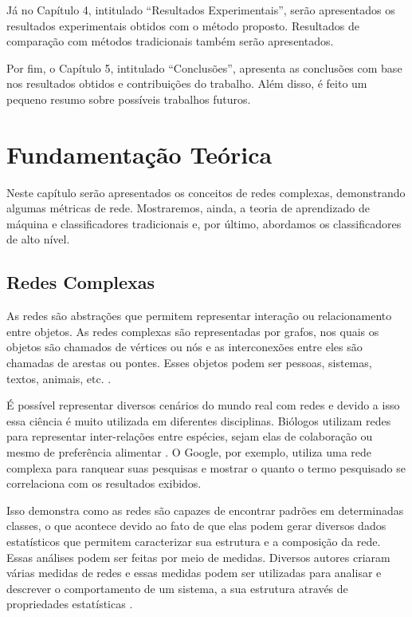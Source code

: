 \documentclass[
12pt,        %
oneside,     %
a4paper,     %
english,       %
brazil        %
%
%
]{ppgca}
\begin{document}
Já no Capítulo 4, intitulado “Resultados Experimentais”, serão apresentados os resultados experimentais obtidos com o método proposto. Resultados de comparação com métodos tradicionais também serão apresentados. 

Por fim, o Capítulo 5, intitulado “Conclusões”, apresenta as conclusões com base nos resultados obtidos e contribuições do trabalho. Além disso, é feito um pequeno resumo sobre possíveis trabalhos futuros.

\chapter{Fundamentação Teórica}
Neste capítulo serão apresentados os conceitos de redes complexas, demonstrando algumas métricas de rede. Mostraremos, ainda, a teoria de aprendizado de máquina e classificadores tradicionais e, por último, abordamos os classificadores de alto nível.



\section{Redes Complexas}

As redes são abstrações que permitem representar interação ou relacionamento entre objetos. As redes complexas são representadas por grafos, nos quais os objetos são chamados de vértices ou nós e as interconexões entre eles são chamadas de arestas ou pontes. Esses objetos podem ser pessoas, sistemas, textos, animais, etc. \cite{AlbertBarabasi1999, AlbertBarabasi2002, Newman_2003, Silva2016, ThompsonEtAl, WattsStrogatz1998}.

É possível representar diversos cenários do mundo real com redes e devido a isso essa ciência é muito utilizada em diferentes disciplinas. Biólogos utilizam redes para representar inter-relações entre espécies, sejam elas de colaboração ou mesmo de preferência alimentar \cite{Pilosof2017}. O Google, por exemplo, utiliza uma rede complexa para ranquear suas pesquisas e mostrar o quanto o termo pesquisado se correlaciona com os resultados exibidos.

Isso demonstra como as redes são capazes de encontrar padrões em determinadas classes, o que acontece devido ao fato de que elas podem gerar diversos dados estatísticos que permitem caracterizar sua estrutura e a composição da rede. Essas análises podem ser feitas por meio de medidas. Diversos autores criaram várias medidas de redes e essas medidas podem ser utilizadas para analisar e descrever o comportamento de um sistema, a sua estrutura através de propriedades estatísticas \cite{Newman_2003, Silva2016}.
\end{document}

